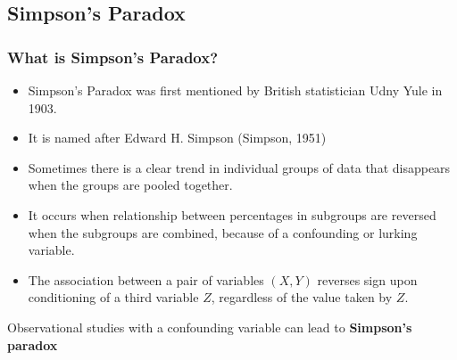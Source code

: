 \documentclass[a4paper]{article}\usepackage[]{graphicx}\usepackage[]{xcolor}
\begin{document}
\subsection{Simpson's Paradox}
\subsubsection{What is Simpson's Paradox?}
\begin{itemize}
	\item Simpson's Paradox was first mentioned by British statistician Udny Yule in 1903.
	\item It is named after Edward H. Simpson (Simpson, 1951)
	\item Sometimes there is a clear trend in individual groups of data that disappears when the groups are pooled together.
	\item It occurs when relationship between percentages in subgroups are reversed when the subgroups are combined, because of a confounding or lurking variable.
	\item The association between a pair of variables \( (X,Y) \) reverses sign upon conditioning of a third variable \( Z \), regardless of the value taken by \( Z \).
\end{itemize}
\begin{goldbox}
	Observational studies with a confounding variable can lead to \textbf{Simpson's paradox}
\end{goldbox}
\end{document}
